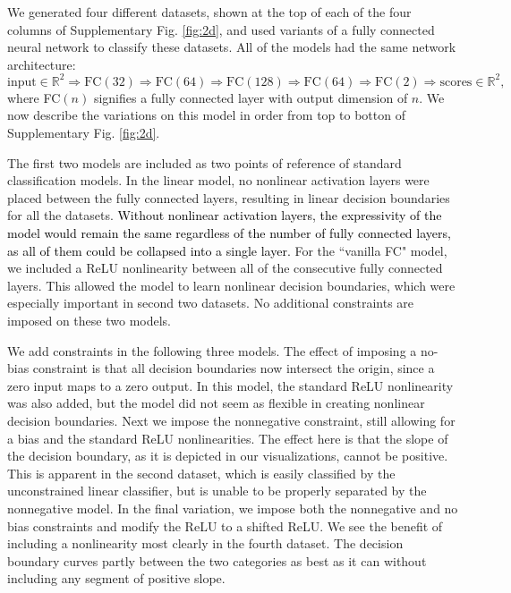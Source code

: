 \documentclass[fleqn,10pt]{wlscirepsupp}
\newcommand{\noteblue}[1]{\textcolor{black}{#1}}
\begin{document}
We generated four different datasets, shown at the top of each of the four columns of Supplementary Fig. \ref{fig:2d}, and used variants of a fully connected neural network to classify these datasets. All of the models had the same network architecture: 
$$\text{input} \in \mathbb{R}^2 \Rightarrow \text{FC}(32) \Rightarrow \text{FC}(64) \Rightarrow \text{FC}(128) \Rightarrow \text{FC}(64) \Rightarrow \text{FC}(2) \Rightarrow \text{scores} \in \mathbb{R}^2,$$
where FC$(n)$ signifies a fully connected layer with output dimension of $n$. We now describe the variations on this model in order from top to botton of Supplementary Fig. \ref{fig:2d}. 

The first two models are included as two points of reference of standard classification models. In the linear model, no nonlinear activation layers were placed between the fully connected layers, resulting in linear decision boundaries for all the datasets. \noteblue{Without nonlinear activation layers, the expressivity of the model would remain the same regardless of the number of fully connected layers, as all of them could be collapsed into a single layer.} For the ``vanilla FC" model, we included a ReLU nonlinearity between all of the consecutive fully connected layers. This allowed the model to learn nonlinear decision boundaries, which were especially important in second two datasets. No additional constraints are imposed on these two models.

We add constraints in the following three models. The effect of imposing a no-bias constraint is that all decision boundaries now intersect the origin, since a zero input maps to a zero output. In this model, the standard ReLU nonlinearity was also added, but the model did not seem as flexible in creating nonlinear decision boundaries. Next we impose the nonnegative constraint, still allowing for a bias and the standard ReLU nonlinearities. The effect here is that the slope of the decision boundary, as it is depicted in our visualizations, cannot be positive. This is apparent in the second dataset, which is easily classified by the unconstrained linear classifier, but is unable to be properly separated by the nonnegative model. In the final variation, we impose both the nonnegative and no bias constraints and modify the ReLU to a shifted ReLU. We see the benefit of including a nonlinearity most clearly in the fourth dataset. The decision boundary curves partly between the two categories as best as it can without including any segment of positive slope. 
\end{document}
